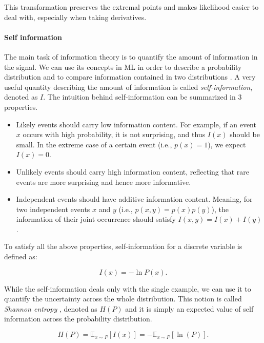 This transformation preserves the extremal points and makes likelihood easier to deal with, especially when taking derivatives. 

\paragraph{Self information}
The main task of information theory is to quantify the amount of information in the signal. We can use its concepts in ML in order to describe a probability distribution and to compare information contained in two distributions \cite{bengio2017deep}. A very useful quantity describing the amount of information is called \emph{self-information}, denoted as $I$. The intuition behind self-information can be summarized in $3$ properties.
\begin{itemize}
    \item Likely events should carry low information content. For example, if an event $x$ occurs with high probability, it is not surprising, and thus $I(x)$ should be small. In the extreme case of a certain event (i.e., $p(x) = 1$), we expect $I(x) = 0$.
    \item Unlikely events should carry high information content, reflecting that rare events are more surprising and hence more informative.
    \item Independent events should have additive information content. Meaning, for two independent events $x$ and $y$ (i.e., $p(x, y) = p(x)p(y)$), the information of their joint occurrence should satisfy $I(x, y) = I(x) + I(y)$.
\end{itemize}

To satisfy all the above properties, self-information for a discrete variable is defined as:

\begin{equation}
	\label{eq:self-information}
	I(x) = - \ln P(x).
\end{equation}

While the self-information deals only with the single example, we can use it to quantify the uncertainty across the whole distribution. This notion is called \emph{Shannon entropy} \cite{bengio2017deep}, denoted as $H(P)$ and it is simply an expected value of self information across the probability distribution.

\begin{equation} 
    \label{eq:shannon-entropy} 
    H(P) = \mathbb{E}_{x \sim P}[I(x)] = - \mathbb{E}_{x \sim P}[\ln(P)]. 
\end{equation}


